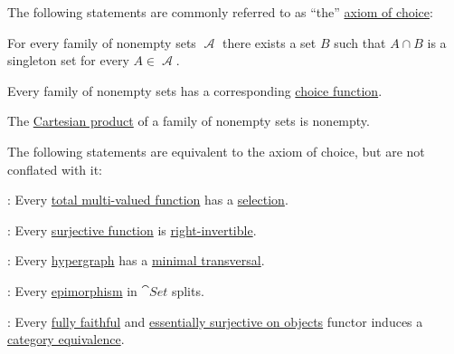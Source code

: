 \begin{theorem}\label{thm:axiom_of_choice_equivalences}
  The following statements are commonly referred to as \enquote{the} \hyperref[def:zfc/choice]{axiom of choice}:
  \begin{thmenum}[series=thm:axiom_of_choice_equivalences]
     For every family of nonempty sets \( \mscrA \) there exists a set \( B \) such that \( A \cap B \) is a singleton set for every \( A \in \mscrA \).

     Every family of nonempty sets has a corresponding \hyperref[def:choice_function]{choice function}.

     The \hyperref[def:cartesian_product]{Cartesian product} of a family of nonempty sets is nonempty.
  \end{thmenum}

  The following statements are equivalent to the axiom of choice, but are not conflated with it:
  \begin{thmenum}[resume=thm:axiom_of_choice_equivalences]
     : Every \hyperref[def:multi_valued_function/total]{total multi-valued function} has a \hyperref[def:function/selection]{selection}.

     : Every \hyperref[def:function_invertibility/surjective]{surjective function} is \hyperref[def:morphism_invertibility/right_invertible]{right-invertible}.

     : Every \hyperref[def:hypergraph]{hypergraph} has a \hyperref[def:hypergraph_minimal_transversal]{minimal transversal}.

     : Every \hyperref[def:morphism_invertibility/right_cancellative]{epimorphism} in \hyperref[def:category_of_small_sets]{\( \cat{Set} \)} splits.

     : Every \hyperref[def:functor_invertibility/fully_faithful]{fully faithful} and \hyperref[def:functor_invertibility/surjective_on_objects]{essentially surjective on objects} functor induces a \hyperref[def:category_equivalence]{category equivalence}.


\end{thmenum}
\end{theorem}
